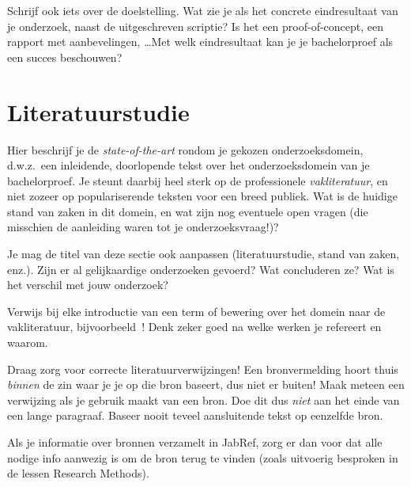 Schrijf ook iets over de doelstelling. Wat zie je als het concrete eindresultaat van je onderzoek, naast de uitgeschreven scriptie? Is het een proof-of-concept, een rapport met aanbevelingen, \ldots Met welk eindresultaat kan je je bachelorproef als een succes beschouwen?


\section{Literatuurstudie}%
\label{sec:literatuurstudie}

Hier beschrijf je de \emph{state-of-the-art} rondom je gekozen onderzoeksdomein, d.w.z.\ een inleidende, doorlopende tekst over het onderzoeksdomein van je bachelorproef. Je steunt daarbij heel sterk op de professionele \emph{vakliteratuur}, en niet zozeer op populariserende teksten voor een breed publiek. Wat is de huidige stand van zaken in dit domein, en wat zijn nog eventuele open vragen (die misschien de aanleiding waren tot je onderzoeksvraag!)?

Je mag de titel van deze sectie ook aanpassen (literatuurstudie, stand van zaken, enz.). Zijn er al gelijkaardige onderzoeken gevoerd? Wat concluderen ze? Wat is het verschil met jouw onderzoek?

Verwijs bij elke introductie van een term of bewering over het domein naar de vakliteratuur, bijvoorbeeld~\autocite{Hykes2013}! Denk zeker goed na welke werken je refereert en waarom.

Draag zorg voor correcte literatuurverwijzingen! Een bronvermelding hoort thuis \emph{binnen} de zin waar je je op die bron baseert, dus niet er buiten! Maak meteen een verwijzing als je gebruik maakt van een bron. Doe dit dus \emph{niet} aan het einde van een lange paragraaf. Baseer nooit teveel aansluitende tekst op eenzelfde bron.

Als je informatie over bronnen verzamelt in JabRef, zorg er dan voor dat alle nodige info aanwezig is om de bron terug te vinden (zoals uitvoerig besproken in de lessen Research Methods).


